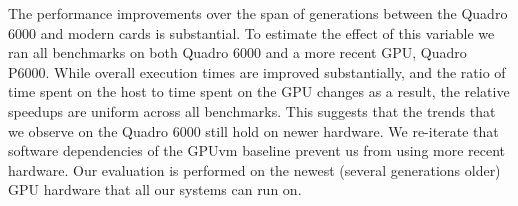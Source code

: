  The performance improvements over the
span of generations between the Quadro 6000
and modern cards is substantial. To estimate the effect of this variable we
ran all benchmarks on both Quadro 6000 and a more recent GPU, Quadro P6000.
While overall execution times are improved substantially, and the ratio of
time spent on the host to time spent on the GPU changes as a result, the
relative speedups are uniform across all benchmarks. This suggests that the
trends that we observe on the Quadro 6000 still hold on newer hardware. We
re-iterate that software dependencies of the GPUvm baseline prevent us
from using more recent hardware. Our evaluation is performed on the newest
(several generations older) GPU hardware that all our systems can run on.
